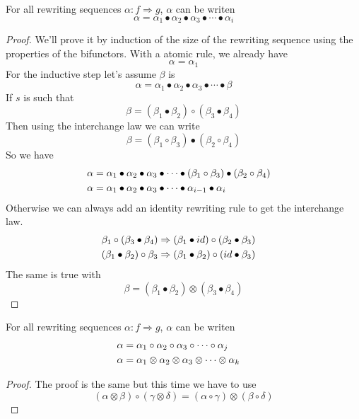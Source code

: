 \documentclass[a4paper]{article}
\begin{document}
\begin{proposition}
For all rewriting sequences $\alpha: f \Rightarrow g$, $\alpha$ can be writen
\[
\alpha = \alpha_1 \bullet \alpha_2 \bullet \alpha_3 \bullet \cdots \bullet
  \alpha_i
\]

\begin{proof}
We'll prove it by induction of the size of the rewriting sequence using the
  properties of the bifunctors.
With a atomic rule, we already have
\[
\alpha = \alpha_1
\]
For the inductive step let's assume $\beta$ is
\[
\alpha = \alpha_1 \bullet \alpha_2 \bullet \alpha_3 \bullet \cdots \bullet \beta
\]
If $s$ is such that
\[
\beta = (\beta_1 \bullet \beta_2) \circ (\beta_3 \bullet \beta_4)
\]
Then using the interchange law we can write
\[
\beta = (\beta_1 \circ \beta_3) \bullet (\beta_2 \circ \beta_4)
\]
So we have 
\begin{align}
\alpha &= \alpha_1 \bullet \alpha_2 \bullet \alpha_3 \bullet \cdots \bullet
  (\beta_1 \circ \beta_3) \bullet (\beta_2 \circ \beta_4) \cr
\alpha &= \alpha_1 \bullet \alpha_2 \bullet \alpha_3 \bullet \cdots \bullet
  \alpha_{i - 1} \bullet \alpha_i
\end{align}
Otherwise we can always add an identity rewriting rule to get the interchange
  law.
\begin{align}
\beta_1 \circ (\beta_3 \bullet \beta_4) &\Rightarrow (\beta_1 \bullet id) \circ
  (\beta_2 \bullet \beta_3) \cr
(\beta_1 \bullet \beta_2) \circ \beta_3 &\Rightarrow (\beta_1 \bullet \beta_2)
  \circ (id \bullet \beta_3)
\end{align}
The same is true with
\[
\beta = (\beta_1 \bullet \beta_2) \otimes (\beta_3 \bullet \beta_4)
\]
\end{proof}
\end{proposition}

\begin{proposition}
For all rewriting sequences $\alpha: f \Rightarrow g$, $\alpha$ can be writen
\begin{align}
\alpha &= \alpha_1 \circ \alpha_2 \circ \alpha_3 \circ \cdots \circ \alpha_j \cr
\alpha &= \alpha_1 \otimes \alpha_2 \otimes \alpha_3 \otimes \cdots \otimes
  \alpha_k
\end{align}

\begin{proof}
The proof is the same but this time we have to use
\[
(\alpha \otimes \beta) \circ (\gamma \otimes \delta) = (\alpha \circ \gamma)
  \otimes (\beta \circ \delta)
\]
\end{proof}
\end{proposition}
\end{document}
